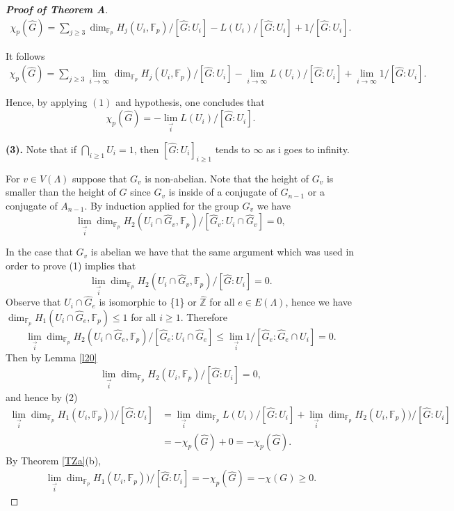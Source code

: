 \documentclass[10pt]{amsart}
\theoremstyle{plain}
\theoremstyle{definition}
\theoremstyle{remark}
\numberwithin{prop}{section}
\numberwithin{example}{section}
\numberwithin{equation}{section}
\newcommand{\Z}{\mathbb{Z}}
\newcommand{\F}{\mathbb{F}}
\begin{document}
\begin{proof}[\textbf{Proof of Theorem A}]
		\begin{align}
			\chi_p(\widehat{G})=\sum_{j\geq 3}{ \dim_{\F_p}{H_j(U_i,\F_p)}/[\widehat{G}:U_i]}-{L(U_i)}/[\widehat{G}:U_i]+1/[\widehat{G}:U_i].
		\end{align}
		
		It follows  \begin{align}
			\chi_p(\widehat{G})=\sum_{j\geq 3}{\lim_{i\rightarrow\infty}{ \dim_{\F_p}H_j(U_i,\F_p)}/[\widehat{G}:U_i]}-\lim_{i\rightarrow\infty}{L(U_i)/[\widehat{G}:U_i]}+\lim_{i\rightarrow\infty}{1/[\widehat{G}:U_i]}.
		\end{align}
		
		Hence, 
		by applying $(1)$ and hypothesis, one concludes that
		$$\chi_p(\widehat{G})=-\lim_{\overrightarrow{i}}{L(U_i)/[\widehat{G}:U_i]}.$$
		
		\item[\textbf{(3).}] Note that if  $\displaystyle\bigcap_{i\geq 1}{U_i}=1$, then   ${[\widehat{G}:U_i]}_{i\geq 1}$ tends to $\infty$ as i goes to infinity. 
		
		For $v\in V(\Lambda)$ suppose that $G_v$ is non-abelian. Note that the height of $G_v$ is smaller than the height of $G$ since $G_v$ is inside of 	a conjugate of $G_{n-1}$ or a conjugate of $A_{n-1}$. By induction applied for the group
		$G_v$  we have 
		$$\displaystyle\lim_{\overrightarrow{i}}{\dim_{\F_p}{H_2(U_i\cap \widehat{G}_v,\F_p)}/[\widehat{G}_v:U_i\cap \widehat{G}_v]}=0,$$
		
		In the case that  $G_v$ is abelian we have that the same argument which was used 
		in order to prove  (1) implies that  $$\displaystyle\lim_{\overrightarrow{i}}{\dim_{\F_p}{H_2(U_i\cap \widehat{G}_v ,\F_p)}/[\widehat{G}:U_i]}=0.$$
		Observe that $U_i\cap \widehat{G}_e$ is isomorphic to \{1\} or     $\widehat{\Z}$   for all $ e\in E(\Lambda)$, hence
		we have  $\dim_{\F_p}H_1(U_i\cap \widehat{G}_e,\F_p)\leq 1$ for all $i\geq 1$. Therefore  $$\displaystyle\lim_{\overrightarrow{i}}\dim_{\F_p}{H_2(U_i\cap \widehat{G}_e,\F_p)}/[\widehat{G}_e:U_i\cap \widehat{G}_e]\leq \displaystyle\lim_{\overrightarrow{i}}{1/[\widehat{G}_e:\widehat{G}_e\cap U_i]}=0.$$ 
		Then by  Lemma \ref{l20} 
		\begin{align}
			\displaystyle\lim_{\overrightarrow{i}}{\dim_{\F_p}{H_2(U_i,\F_p)}/[\widehat{G}:U_i]}=0,
		\end{align}
		and hence by (2)
		\begin{align*}
			\lim_{\overrightarrow{i}}{\dim_{\F_p}{H_1(U_i,\F_p)\big)}/[\widehat{G}:U_i]}&=\lim_{\overrightarrow{i}}\dim_{\F_p}{L(U_i)/[\widehat{G}:U_i]} + \lim_{\overrightarrow{i}}\dim_{\F_p}{{H_2(U_i,\F_p)\big)}/[\widehat{G}:U_i]}\\
			&=-\chi_p(\widehat{G})+0=-\chi_p(\widehat{G}). 
	\end{align*}
By Theorem \ref{TZa}(b),		
	\begin{align*}
	\lim_{\overrightarrow{i}}{\dim_{\F_p}{H_1(U_i,\F_p)\big)}/[\widehat{G}:U_i]}=-\chi_p(\widehat{G})=-\chi(G)\geq 0. 
\end{align*}
		
	\end{proof}
\end{document}
